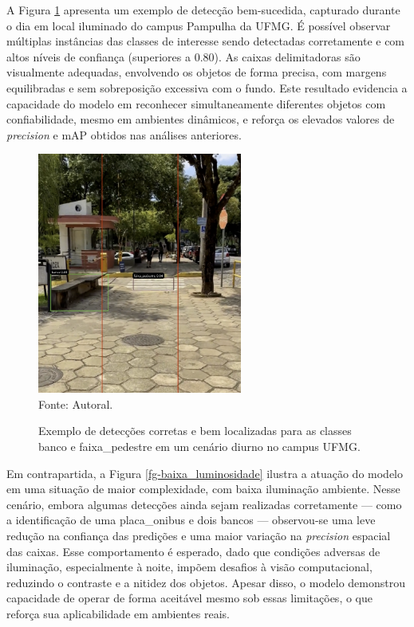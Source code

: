 A Figura \ref{fg-exemplo-deteccao-dia} apresenta um exemplo de detecção bem-sucedida, capturado durante o dia em local iluminado do campus Pampulha da UFMG. É possível observar múltiplas instâncias das classes de interesse sendo detectadas corretamente e com altos níveis de confiança (superiores a 0.80). As caixas delimitadoras são visualmente adequadas, envolvendo os objetos de forma precisa, com margens equilibradas e sem sobreposição excessiva com o fundo. Este resultado evidencia a capacidade do modelo em reconhecer simultaneamente diferentes objetos com confiabilidade, mesmo em ambientes dinâmicos, e reforça os elevados valores de \textit{precision} e mAP obtidos nas análises anteriores.

\begin{figure}[htbp]
  \centering
  \caption{Exemplo de detecções corretas e bem localizadas para as classes banco e faixa\_pedestre em um cenário diurno no campus UFMG.}
  \includegraphics[width=0.6\textwidth]{Figuras/exemplo-deteccao-dia.png}
  \\
  Fonte: Autoral.
  \label{fg-exemplo-deteccao-dia}
\end{figure}

Em contrapartida, a Figura \ref{fg-baixa_luminosidade} ilustra a atuação do modelo em uma situação de maior complexidade, com baixa iluminação ambiente. Nesse cenário, embora algumas detecções ainda sejam realizadas corretamente — como a identificação de uma placa\_onibus e dois bancos — observou-se uma leve redução na confiança das predições e uma maior variação na \textit{precision} espacial das caixas. Esse comportamento é esperado, dado que condições adversas de iluminação, especialmente à noite, impõem desafios à visão computacional, reduzindo o contraste e a nitidez dos objetos. Apesar disso, o modelo demonstrou capacidade de operar de forma aceitável mesmo sob essas limitações, o que reforça sua aplicabilidade em ambientes reais.

